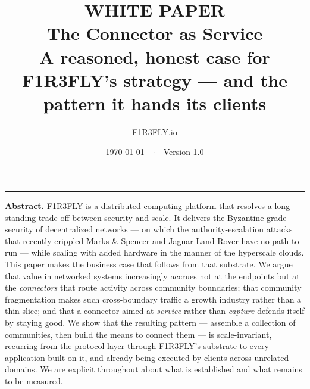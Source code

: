 \documentclass[11pt]{article}
\title{\vspace{-2.2em}
{\normalsize\sffamily\bfseries\color{accent}WHITE PAPER}\\[0.7em]
\textbf{The Connector as Service}\\[0.35em]
{\large\mdseries A reasoned, honest case for F1R3FLY's strategy --- and the pattern it hands its clients}}
\author{\normalsize F1R3FLY.io}
\date{\normalsize\today\ \ $\cdot$\ \ Version 1.0}
\begin{document}
\maketitle
\thispagestyle{fancy}
\vspace{-1em}
\hrule
\vspace{1.2em}

\noindent\textbf{\color{ink}Abstract.} F1R3FLY is a distributed-computing platform that resolves a long-standing trade-off between security and scale. It delivers the Byzantine-grade security of decentralized networks --- on which the authority-escalation attacks that recently crippled Marks \& Spencer and Jaguar Land Rover have no path to run --- while scaling with added hardware in the manner of the hyperscale clouds. This paper makes the business case that follows from that substrate. We argue that value in networked systems increasingly accrues not at the endpoints but at the \emph{connectors} that route activity across community boundaries; that community fragmentation makes such cross-boundary traffic a growth industry rather than a thin slice; and that a connector aimed at \emph{service} rather than \emph{capture} defends itself by staying good. We show that the resulting pattern --- assemble a collection of communities, then build the means to connect them --- is scale-invariant, recurring from the protocol layer through F1R3FLY's substrate to every application built on it, and already being executed by clients across unrelated domains. We are explicit throughout about what is established and what remains to be measured.

\vspace{1.2em}
\end{document}
